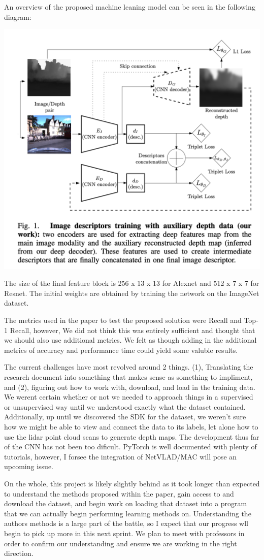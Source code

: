 \documentclass[11pt]{article}
\begin{document}
An overview of the proposed machine leaning model can be seen in the following diagram:\\
\begin{center}
    \includegraphics[width=0.5\linewidth]{"../images/fig1"}
\end{center}
The size of the final feature block is 256 x 13 x 13 for Alexnet and 512 x 7 x 7 for Resnet. The initial weights are obtained by training the network on the ImageNet dataset.


The metrics used in the paper to test the proposed solution were Recall and Top-1 Recall, however, We did not think this was entirely sufficient and thought that we should also use additional metrics. We felt as though adding in the additional metrics of accuracy and performance time could yield some valuble results.

The current challenges have most revolved around 2 things. (1), Translating the research document into something that makes sense as something to impliment, and (2), figuring out how to work with, download, and load in the training data. We werent certain whether or not we needed to approach things in a supervised or unsupervised way until we understood exactly what the dataset contained. Additionally, up until we discovered the SDK for the dataset, we weren't sure how we might be able to view and connect the data to its labels, let alone how to use the lidar point cloud scans to generate depth maps. The development thus far of the CNN has not been too dificult. PyTorch is well documented with plenty of tutorials, however, I forsee the integration of NetVLAD/MAC will pose an upcoming issue.

On the whole, this project is likely slightly behind as it took longer than expected to understand the methods proposed within the paper, gain access to and download the dataset, and begin work on loading that dataset into a program that we can actually begin performing learning methods on. Understanding the authors methods is a large part of the battle, so I expect that our progress wll begin to pick up more in this next sprint. We plan to meet with professors in order to confirm our understanding and ensure we are working in the right direction.
\end{document}
